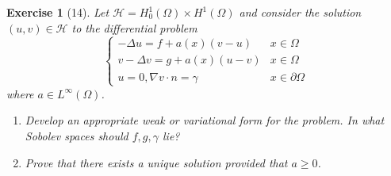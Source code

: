 \documentclass[letterpaper,twoside,11pt]{article}
\theoremstyle{mystyle}
\newtheorem*{exercise}{Exercise}
\begin{document}
\begin{exercise}[14]
Let $\mathcal H = H_0^1 \left( \Omega \right) \times H^1 \left( \Omega \right)$ and consider the solution $\left( u,v \right)\in \mathcal H$ to the differential problem  
\[\left\{ {\begin{array}{*{20}{c}}
  - \Delta u = f + a(x)\left( v-u \right) & x \in \Omega \\[.2cm] 
  v - \Delta v = g + a(x)(u-v) & x \in \Omega \\[.2cm] 
  u = 0, \nabla v \cdot n = \gamma & x \in \partial \Omega
\end{array}} \right.\]
where $a \in L^\infty \left( \Omega \right)$. 
\begin{enumerate}
  \item Develop an appropriate weak or variational form for the problem. In what Sobolev spaces should $f, g, \gamma$ lie? 
  \item Prove that there exists a unique solution provided that $a \geq 0$. 
\end{enumerate}
\end{exercise}
\end{document}
